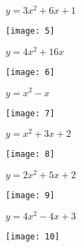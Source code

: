 \documentclass[a4paper]{oblivoir}
\begin{document}
\clearpage
\begin{minipage}{0.45\textwidth}\centering
\(y=3x^2+6x+1\)
\par\bigskip\texttt{[image: 5]}
\end{minipage}
\begin{minipage}{0.45\textwidth}\centering
\(y=4x^2+16x\)
\par\bigskip\texttt{[image: 6]}
\end{minipage}\bigskip\bigskip\par
\begin{minipage}{0.45\textwidth}\centering
\(y=x^2-x\)
\par\bigskip\texttt{[image: 7]}
\end{minipage}
\begin{minipage}{0.45\textwidth}\centering
\(y=x^2+3x+2\)
\par\bigskip\texttt{[image: 8]}
\end{minipage}\bigskip\bigskip\par
\begin{minipage}{0.45\textwidth}\centering
\(y=2x^2+5x+2\)
\par\bigskip\texttt{[image: 9]}
\end{minipage}
\begin{minipage}{0.45\textwidth}\centering
\(y=4x^2-4x+3\)
\par\bigskip\texttt{[image: 10]}
\end{minipage}\bigskip\bigskip\par
\end{document}
